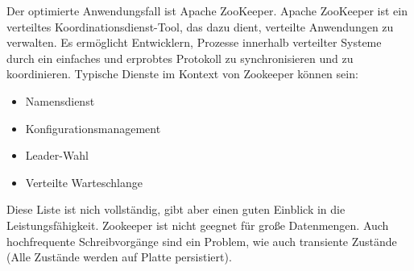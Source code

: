Der optimierte Anwendungsfall ist Apache ZooKeeper. Apache ZooKeeper ist ein verteiltes Koordinationsdienst-Tool, das dazu dient, verteilte Anwendungen zu verwalten. Es ermöglicht Entwicklern, Prozesse innerhalb verteilter Systeme durch ein einfaches und erprobtes Protokoll zu synchronisieren und zu koordinieren.
Typische Dienste im Kontext von Zookeeper können sein:

\begin{itemize}
\item Namensdienst
\item Konfigurationsmanagement
\item Leader-Wahl
\item Verteilte Warteschlange
\end{itemize}
Diese Liste ist nich vollständig, gibt aber einen guten Einblick in die Leistungsfähigkeit. Zookeeper ist nicht geegnet für große Datenmengen. Auch hochfrequente Schreibvorgänge sind ein Problem, wie auch transiente Zustände (Alle Zustände werden auf Platte persistiert).



